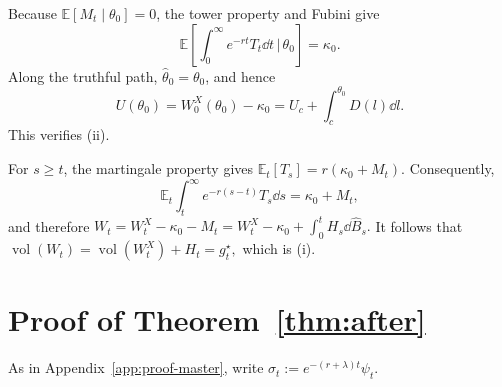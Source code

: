 \documentclass[12pt]{article}
\DeclareMathOperator{\vol}{vol}
\newcommand{\hth}{\hat\theta}
\newcommand{\hB}{\hat B}
\begin{document}
Because \(\mathbb E[M_t\mid\theta_0]=0\), the tower property and Fubini give
\[
  \mathbb E\!\left[
    \int_0^\infty e^{-rt}T_t\dd t\,\bigg|\,\theta_0
  \right]
  =\kappa_0.
\]
Along the truthful path, \(\hth_0=\theta_0\), and hence
\[
  U(\theta_0)
  =W_0^X(\theta_0)-\kappa_0
  =U_c+\int_c^{\theta_0}D(l)\dd l.
\]
This verifies (ii).

For \(s\ge t\), the martingale property gives
\(\mathbb E_t[T_s]=r(\kappa_0+M_t)\). Consequently,
\[
  \mathbb E_t\int_t^\infty e^{-r(s-t)}T_s\dd s
  =\kappa_0+M_t,
\]
and therefore
\(
  W_t
  =W_t^X-\kappa_0-M_t
  =W_t^X-\kappa_0+\int_0^tH_s\dd\hB_s .
\)
It follows that
\(
  \vol(W_t)
  =\vol(W_t^X)+H_t
  =g_t^\star,
\)
which is (i). %




\section{Proof of Theorem~\ref{thm:after}}
\label{app:proof-after}

As in Appendix~\ref{app:proof-master}, write
\(\sigma_t:=e^{-(r+\lambda)t}\psi_t\).
\end{document}
